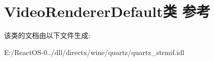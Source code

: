 \hypertarget{class_video_renderer_default}{}\section{Video\+Renderer\+Default类 参考}
\label{class_video_renderer_default}


该类的文档由以下文件生成\+:\begin{DoxyCompactItemize}
\item 
E\+:/\+React\+O\+S-\/0../dll/directx/wine/quartz/quartz\+\_\+strmif.\+idl\end{DoxyCompactItemize}
